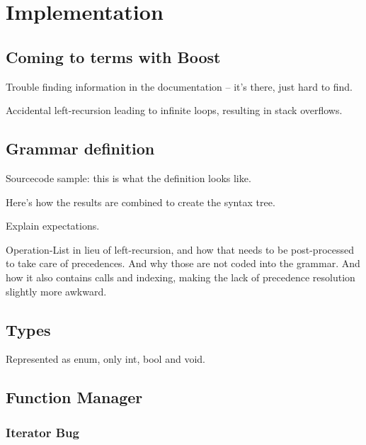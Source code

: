 \chapter{Implementation}

    
    \section{Coming to terms with Boost}
    
        Trouble finding information in the documentation -- it's there, just hard to find.
        
        Accidental left-recursion leading to infinite loops, resulting in stack overflows.
    
    \section{Grammar definition}
    
        Sourcecode sample: this is what the definition looks like.
        
        Here's how the results are combined to create the syntax tree.
        
        Explain expectations.
        
        Operation-List in lieu of left-recursion, and how that needs to be post-processed to take care of precedences. And why those are not coded into the grammar. And how it also contains calls and indexing, making the lack of precedence resolution slightly more awkward.
    
    \section{Types}
        
        Represented as enum, only int, bool and void.
    
    \section{Function Manager}
    
        
        \subsection{Iterator Bug}
            
